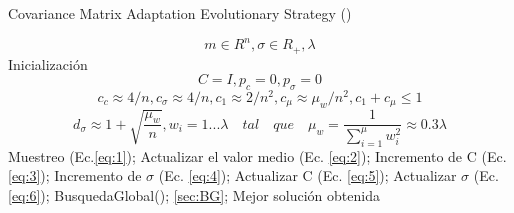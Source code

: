 
\begin{algorithm}[]
  \caption{Covariance Matrix Adaptation Evolutionary Strategy (\mbox{})}
  \label{pseu:cmaes}
  \begin{algorithmic}[1]
    \REQUIRE \[ m\in R^{n}, \sigma\in R_{+}, \lambda\]
    \STATE Inicialización 
    \[C = I, p_{c} = 0, p_{\sigma} = 0\]
    \[ c_{c}\approx 4/n, c_{\sigma}\approx 4/n, c_{1}\approx 2/n^2, c_{\mu}\approx \mu_{w}/n^2, c_{1} + c_{\mu}\leq 1\]
    \[ d_{\sigma}\approx 1+\sqrt{\frac{\mu_{w}}{n}}, 
    w_{i}=1...\lambda \quad tal\quad que \quad \mu_{w} = \frac{1}{\sum_{i=1}^{\mu}w_{i}^2}\approx 0.3\lambda\]
      \STATE Muestreo (Ec.\ref{eq:1});
      \STATE Actualizar el valor medio (Ec. \ref{eq:2});
      \STATE Incremento de C (Ec. \ref{eq:3});
      \STATE Incremento de $\sigma$ (Ec. \ref{eq:4});
      \STATE Actualizar C (Ec. \ref{eq:5});
      \STATE Actualizar $\sigma$ (Ec. \ref{eq:6});
      \STATE BusquedaGlobal(); \ref{sec:BG};
        \ENDIF
    \ENDWHILE
    \RETURN Mejor solución obtenida
  \end{algorithmic}
\end{algorithm}